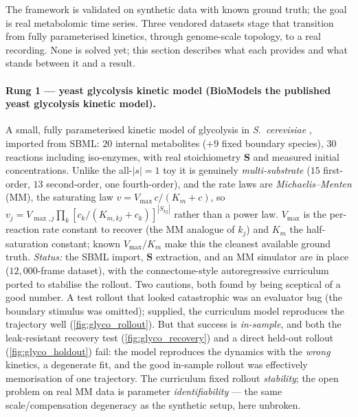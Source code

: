 \documentclass[11pt]{article}
\begin{document}
The framework is validated on synthetic data with known ground truth; the goal is real
metabolomic time series. Three vendored datasets stage that transition from fully parameterised
kinetics, through genome-scale topology, to a real recording. None is solved yet; this section
describes what each provides and what stands between it and a result.

\paragraph{Rung 1 --- yeast glycolysis kinetic model (BioModels
the published yeast glycolysis kinetic model).}
A small, fully parameterised kinetic model of glycolysis in \emph{S.\ cerevisiae}
\citep{smallbone2013}, imported from SBML: $20$ internal metabolites ($+9$ fixed boundary
species), $30$ reactions including iso-enzymes, with real stoichiometry $\mathbf{S}$ and
measured initial concentrations. Unlike the all-$|s|{=}1$ toy it is genuinely
\emph{multi-substrate} ($15$ first-order, $13$ second-order, one fourth-order), and the rate
laws are \emph{Michaelis--Menten} (MM), the saturating law $v = V_{\max}\,c/(K_m+c)$, so
$v_j = V_{\max,j}\prod_k[c_k/(K_{m,kj}+c_k)]^{|S_{kj}|}$ rather than a power law. $V_{\max}$ is
the per-reaction rate constant to recover (the MM analogue of $k_j$) and $K_m$ the
half-saturation constant; known $V_{\max}/K_m$ make this the cleanest available ground truth.
\emph{Status:} the SBML import, $\mathbf{S}$ extraction, and an MM simulator are in place
($12{,}000$-frame dataset), with the connectome-style autoregressive curriculum ported to
stabilise the rollout. Two cautions, both found by being sceptical of a good number. A test
rollout that looked catastrophic was an evaluator bug (the boundary stimulus was omitted);
supplied, the curriculum model reproduces the trajectory well (\cref{fig:glyco_rollout}). But
that success is \emph{in-sample}, and both the leak-resistant recovery test
(\cref{fig:glyco_recovery}) and a direct held-out rollout (\cref{fig:glyco_holdout}) fail: the
model reproduces the dynamics with the \emph{wrong} kinetics, a degenerate fit, and the good
in-sample rollout was effectively memorisation of one trajectory. The curriculum fixed rollout
\emph{stability}; the open problem on real MM data is parameter \emph{identifiability} --- the
same scale/compensation degeneracy as the synthetic setup, here unbroken.
\end{document}

